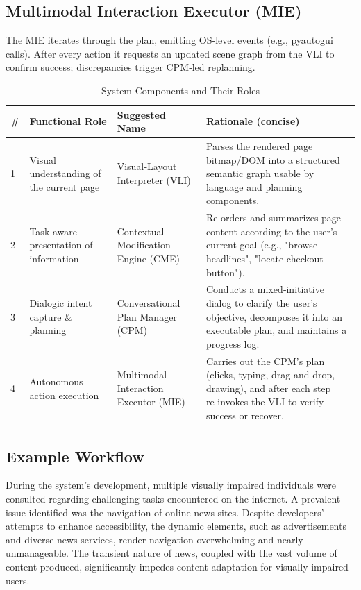 \documentclass[conference]{IEEEtran}
\begin{document}
\subsection{Multimodal Interaction Executor (MIE)}

The MIE iterates through the plan, emitting OS‑level events (e.g., pyautogui calls). After every action it requests an updated scene graph from the VLI to confirm success; discrepancies trigger CPM‑led replanning.


\begin{table}[ht]
\centering
\caption{System Components and Their Roles}
\label{tab:architecture}
\small
\renewcommand{\arraystretch}{1.5}
\begin{tabular}{|p{0.5cm}|p{2cm}|p{2.5cm}|p{6cm}|}
\hline
\textbf{\#} & \textbf{Functional Role} & \textbf{Suggested Name} & \textbf{Rationale (concise)} \\
\hline
1 & Visual understanding of the current page & Visual‑Layout Interpreter (VLI) & Parses the rendered page bitmap/DOM into a structured semantic graph usable by language and planning components. \\
\hline
2 & Task‑aware presentation of information & Contextual Modification Engine (CME) & Re‑orders and summarizes page content according to the user's current goal (e.g., "browse headlines", "locate checkout button"). \\
\hline
3 & Dialogic intent capture \& planning & Conversational Plan Manager (CPM) & Conducts a mixed‑initiative dialog to clarify the user's objective, decomposes it into an executable plan, and maintains a progress log. \\
\hline
4 & Autonomous action execution & Multimodal Interaction Executor (MIE) & Carries out the CPM's plan (clicks, typing, drag‑and‑drop, drawing), and after each step re‑invokes the VLI to verify success or recover. \\
\hline
\end{tabular}
\vspace{0.5cm}
\end{table}


\subsection*{Example Workflow}

During the system's development, multiple visually impaired individuals were consulted regarding challenging tasks encountered on the internet. A prevalent issue identified was the navigation of online news sites. Despite developers' attempts to enhance accessibility, the dynamic elements, such as advertisements and diverse news services, render navigation overwhelming and nearly unmanageable. The transient nature of news, coupled with the vast volume of content produced, significantly impedes content adaptation for visually impaired users. 
\end{document}
